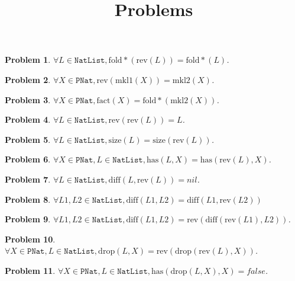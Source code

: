 \documentclass[12pt, a4paper]{article}
\title{Problems}
\date{\vspace{-5ex}}
\newtheorem{problem}{Problem}
\newcommand{\rmx}[1]{\mathrm{#1}}
\begin{document}
\maketitle

\begin{problem}
$\forall L \in \mathtt{NatList}, \rmx{fold*}(\rmx{rev}(L)) = \rmx{fold*}(L)$.
\end{problem}

\begin{problem}
$\forall X \in \mathtt{PNat}, \rmx{rev}(\rmx{mkl1}(X)) = \rmx{mkl2}(X)$.
\end{problem}

\begin{problem}
$\forall X \in \mathtt{PNat}, \rmx{fact}(X) = \rmx{fold*}(\rmx{mkl2}(X))$.
\end{problem}

\begin{problem}
$\forall L \in \mathtt{NatList}, \rmx{rev}(\rmx{rev}(L)) = L$.
\end{problem}

\begin{problem}
$\forall L \in \mathtt{NatList}, \rmx{size}(L) = \rmx{size}(\rmx{rev}(L))$.
\end{problem}

\begin{problem}
$\forall X \in \mathtt{PNat}, L \in \mathtt{NatList}, \rmx{has}(L, X) = \rmx{has}(\rmx{rev}(L), X)$.
\end{problem}

\begin{problem}
$\forall L \in \mathtt{NatList}, \rmx{diff}(L, \rmx{rev}(L)) = nil$.
\end{problem}

\begin{problem}
$\forall L1, L2 \in \mathtt{NatList}, \rmx{diff}(L1, L2) = \rmx{diff}(L1, \rmx{rev}(L2))$
\end{problem}

\begin{problem}
$\forall L1, L2 \in \mathtt{NatList}, \rmx{diff}(L1, L2) = \rmx{rev}(\rmx{diff}(\rmx{rev}(L1), L2))$.
\end{problem}

\begin{problem}
$\forall X \in \mathtt{PNat}, L \in \mathtt{NatList}, \rmx{drop}(L, X) = \rmx{rev}(\rmx{drop}(\rmx{rev}(L), X))$.
\end{problem}

\begin{problem}
$\forall X \in \mathtt{PNat}, L \in \mathtt{NatList}, \rmx{has}(\rmx{drop}(L, X), X) = false$.
\end{problem}
\end{document}

